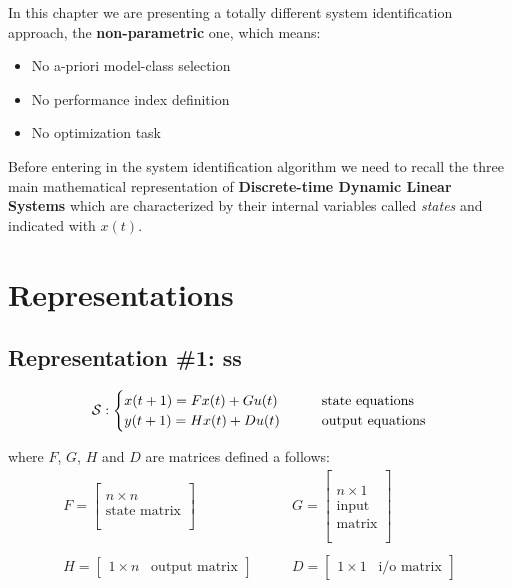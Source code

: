 In this chapter we are presenting a totally different system identification approach, the \textbf{non-parametric} one, which means:
\begin{itemize}
    \item No a-priori model-class selection
    \item No performance index definition
    \item No optimization task
\end{itemize}

Before entering in the system identification algorithm we need to recall the three main mathematical representation of \textbf{Discrete-time Dynamic Linear Systems} which are characterized by their internal variables called \emph{states} and indicated with $x(t)$.


\section{Representations}

\subsection{Representation \#1: \acrfull{ss}}

\[
\mathcal{S}: 
\begin{cases}
    x(t+1) = F x(t) + G u(t) & \qquad \text{state equations} \\
    y(t+1) = H x(t) + D u(t) & \qquad \text{output equations}
\end{cases}
\]

where $F$, $G$, $H$ and $D$ are matrices defined a follows:
\begin{align*}
    F = \begin{bmatrix}
        \\
        n \times n \\
        \text{state matrix} \\ \\
    \end{bmatrix}
    &
    \qquad
    G = \begin{bmatrix}
        \\
        \\
        n \times 1 \\
        \text{input} \\
        \text{matrix} \\ \\
    \end{bmatrix}
    \\ \\
    H = \begin{bmatrix}
        1 \times n \;\;\; \text{output matrix}
    \end{bmatrix}
    &
    \qquad
    D = \begin{bmatrix}
        1 \times 1 \;\;\; \text{i/o matrix}
    \end{bmatrix}
\end{align*}

